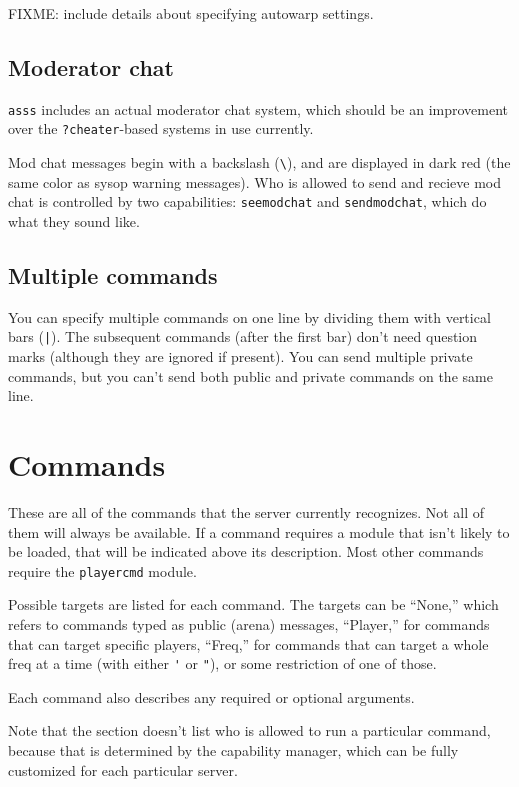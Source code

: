 \documentclass{article}
\newcommand{\asss}{\texttt{asss}}
\begin{document}
FIXME: include details about specifying autowarp settings.


\subsection{Moderator chat}

\asss{} includes an actual moderator chat system, which should be an
improvement over the \verb/?cheater/-based systems in use currently.

Mod chat messages begin with a backslash (\verb/\/), and are displayed
in dark red (the same color as sysop warning messages). Who is allowed
to send and recieve mod chat is controlled by two capabilities:
\texttt{seemodchat} and \texttt{sendmodchat}, which do what they sound
like.


\subsection{Multiple commands}

You can specify multiple commands on one line by dividing them with
vertical bars (\verb/|/). The subsequent commands (after the first bar)
don't need question marks (although they are ignored if present). You
can send multiple private commands, but you can't send both public and
private commands on the same line.


\section{Commands}

These are all of the commands that the server currently recognizes. Not
all of them will always be available. If a command requires a module
that isn't likely to be loaded, that will be indicated above its
description. Most other commands require the \texttt{playercmd} module.

Possible targets are listed for each command. The targets can be
``None,'' which refers to commands typed as public (arena) messages,
``Player,'' for commands that can target specific players, ``Freq,'' for
commands that can target a whole freq at a time (with either \verb/'/ or
\verb/"/), or some restriction of one of those.

Each command also describes any required or optional arguments.

Note that the section doesn't list who is allowed to run a particular
command, because that is determined by the capability manager, which can
be fully customized for each particular server.
\end{document}
